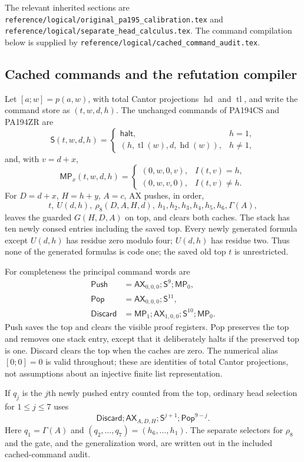 \documentclass[11pt,letterpaper]{article}
\newcommand{\file}[1]{\texttt{\nolinkurl{#1}}}
\begin{document}
The relevant inherited sections are
\file{reference/logical/original_pa195_calibration.tex} and
\file{reference/logical/separate_head_calculus.tex}.
The command compilation below is supplied by
\file{reference/logical/cached_command_audit.tex}.

\subsection{Cached commands and the refutation compiler}
Let $[a;w]=p(a,w)$, with total Cantor projections $\operatorname{hd}$ and
$\operatorname{tl}$, and write the command store as $(t,w,d,h)$. The
unchanged commands of PA194CS and PA194ZR are
\[
 \mathsf S(t,w,d,h)=
 \begin{cases}\mathsf{halt},&h=1,\\
 (h,\operatorname{tl}(w),d,\operatorname{hd}(w)),&h\ne1,
 \end{cases}
\]
and, with $v=d+x$,
\[
 \mathsf{MP}_x(t,w,d,h)=
 \begin{cases}(0,w,0,v),&I(t,v)=h,\\(0,w,v,0),&I(t,v)\ne h.
 \end{cases}
\]
For $D=d+x$, $H=h+y$, $A=c$, AX pushes, in order,
\[
 t,\ U(d,h),\ \rho_8(D,A,H,d),\ h_1,h_2,h_3,h_4,h_5,h_6,\Gamma(A),
\]
leaves the guarded $G(H,D,A)$ on top, and clears both caches.
The stack has ten newly consed entries including the saved top.
Every newly generated formula except $U(d,h)$ has residue zero
modulo four; $U(d,h)$ has residue two. Thus none of the generated formulas
is code one; the saved old top $t$ is unrestricted.

For completeness the principal command words are
\begin{align*}
 \mathsf{Push}&=\mathsf{AX}_{0,0,0};\mathsf S^9;\mathsf{MP}_0,\\
 \mathsf{Pop}&=\mathsf{AX}_{0,0,0};\mathsf S^{11},\\
 \mathsf{Discard}&=\mathsf{MP}_1;\mathsf{AX}_{1,0,0};\mathsf S^{10};\mathsf{MP}_0.
\end{align*}
Push saves the top and clears the visible proof registers. Pop preserves
the top and removes one stack entry, except that it deliberately halts if
the preserved top is one. Discard clears the top when the caches are zero.
The numerical alias $[0;0]=0$ is valid throughout; these are identities
of total Cantor projections, not assumptions about an injective finite
list representation.

If $q_j$ is the $j$th newly pushed entry counted from the top, ordinary
head selection for $1\le j\le7$ uses
\[
 \mathsf{Discard};\mathsf{AX}_{A,D,H};\mathsf S^{j+1};
                              \mathsf{Pop}^{9-j}.
\]
Here $q_1=\Gamma(A)$ and $(q_2,\ldots,q_7)=(h_6,\ldots,h_1)$.
The separate selectors for $\rho_8$ and the gate, and the generalization
word, are written out in the included cached-command audit.
\end{document}
